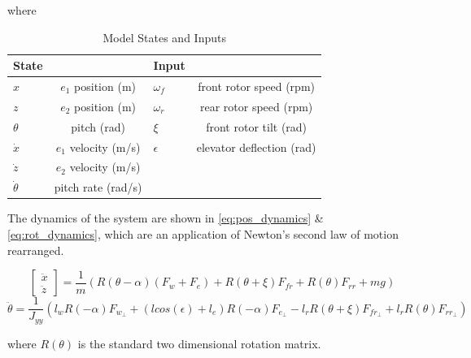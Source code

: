 where
\begin{table}[ht]
  \centering

  \label{tab:basic_table}
  \begin{tabular}{|l|c|l|c|}
    \hline
    State &   & Input&   \\
    \hline
    $x$ & $e_{1}$ position (m)& $\omega_{f}$ & front rotor speed (rpm)\\
    $z$ & $e_{2}$ position (m)& $\omega_{r}$ & rear rotor speed (rpm)\\
    $\theta$ & pitch (rad)& $\xi$& front rotor tilt (rad)\\
    $\dot{x}$ & $e_{1}$ velocity (m/s)&$\epsilon$& elevator deflection (rad)\\
    $\dot{z}$ & $e_{2}$ velocity (m/s)&  & \\
    $\dot{\theta}$ & pitch rate (rad/s)& & \\
    \hline
  \end{tabular}
  \caption{Model States and Inputs}
\end{table}
\FloatBarrier


The dynamics of the system are shown in \eqref{eq:pos_dynamics} \& \eqref{eq:rot_dynamics}, which are an application of Newton's second law of motion rearranged.

\begin{equation}
\begin{bmatrix} \ddot{x}\\\ddot{z} \end{bmatrix}=\frac{1}{m}(R(\theta-\alpha)(F_{w}+F_{e}) + R(\theta+\xi)F_{fr}+R(\theta)F_{rr}+mg)
\label{eq:pos_dynamics}
\end{equation}
\begin{equation}
\ddot{\theta}=\frac{1}{J_{yy}}(    l_{w}R(-\alpha) F_{w_{\perp}}  + (lcos(\epsilon)+l_{e})R(-\alpha)F_{e_{\perp}}  - l_{r}R(\theta+\xi)F_{fr_{\perp}}  + l_{r}R(\theta)F_{rr_{\perp}}   )
\label{eq:rot_dynamics}
\end{equation}

where $R(\theta)$ is the standard two dimensional rotation matrix.

